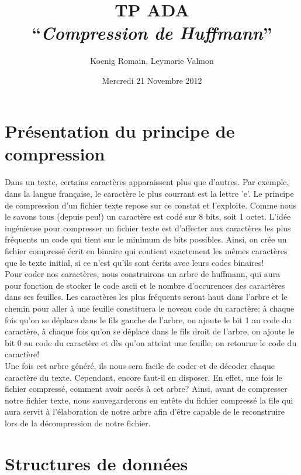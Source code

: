 \documentclass[11pt]{article}
\title{TP ADA\\
``{\em Compression de Huffmann}'' }
\author{Koenig Romain, Leymarie Valmon}
\date{Mercredi 21 Novembre 2012}
\begin{document}
\maketitle
\section{Présentation du principe de compression}
\paragraph{}Dans un texte, certains caractères apparaissent plus que d'autres. Par exemple, dans la langue française, le caractère le plus courrant est la lettre 'e'. Le principe de compression d'un fichier texte repose sur ce constat et l'exploite. Comme nous le savons tous (depuis peu!) un caractère est codé sur 8 bits, soit 1 octet. L'idée ingénieuse pour compresser un fichier texte est d'affecter aux caractères les plus fréquents un code qui tient sur le minimum de bits possibles. Ainsi, on crée un fichier compressé écrit en binaire qui contient exactement les mêmes caractères que le texte initial, si ce n'est qu'ils sont écrits avec leurs codes binaires!\\Pour coder nos caractères, nous construirons un arbre de huffmann, qui aura pour fonction de stocker le code ascii et le nombre d'occurences des caractères dans ses feuilles. Les caractères les plus fréquents seront haut dans l'arbre et le chemin pour aller à une feuille constituera le noveau code du caractère: à chaque fois qu'on se déplace dans le fils gauche de l'arbre, on ajoute le bit 1 au code du caractère, à chaque fois qu'on se déplace dans le fils droit de l'arbre, on ajoute le bit 0 au code du caractère et dès qu'on atteint une feuille, on retourne le code du caractère!\\Une fois cet arbre généré, ils nous sera facile de coder et de décoder chaque caractère du texte. Cependant, encore faut-il en disposer. En effet, une fois le fichier compressé, comment avoir accés à cet arbre? Ainsi, avant de compresser notre fichier texte, nous sauvegarderons en entête du fichier compressé la file qui aura servit à l'élaboration de notre arbre afin d'être capable de le reconstruire lors de la décompression de notre fichier. 


\section{Structures de données}
\end{document}
